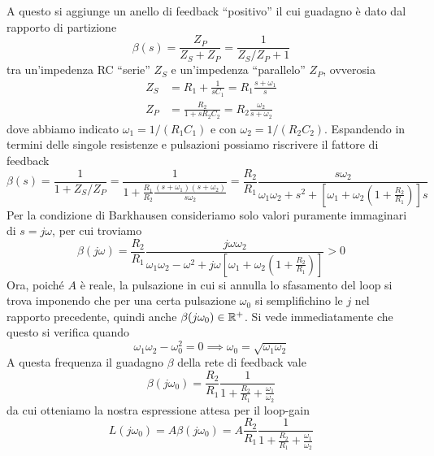 \documentclass[10pt, a4paper, italian]{article}
\begin{document}
A questo si aggiunge un anello di feedback ``positivo'' il cui guadagno è dato
dal rapporto di partizione
\begin{equation} \label{eq:loop-gain-beta}
\beta(s) = \frac{Z_P}{Z_S + Z_P} = \frac{1}{Z_S/Z_P + 1}
\end{equation}
tra un'impedenza RC ``serie'' $Z_S$ e un'impedenza ``parallelo'' $Z_P$,
ovverosia
\begin{align*}
Z_S &= R_1 + \frac{1}{s C_1} = R_1 \frac{s + \omega_1}{s} \\
Z_P &= \frac{R_2}{1 + s R_2 C_2} = R_2 \frac{\omega_2}{s + \omega_2}
\end{align*}
dove abbiamo indicato $\omega_1 = 1/(R_1 C_1)$ e con $\omega_2 = 1/(R_2 C_2)$.
Espandendo in termini delle singole resistenze e pulsazioni possiamo riscrivere
il fattore di feedback
\begin{equation}
\beta(s) = \frac{1}{1 + Z_S/Z_P} =
\frac{1}{1 + \frac{R_1}{R_2} \frac{(s + \omega_1)(s + \omega_2)}{s \omega_2}} =
\frac{R_2}{R_1} \frac{s \omega_2}{\omega_1 \omega_2 + s^2 +
\left[\omega_{1} + \omega_{2} \left(1 + \frac{R_2}{R_{1}}\right)\right] s}
\end{equation}
Per la condizione di Barkhausen consideriamo solo valori puramente immaginari
di $s = j\omega$, per cui troviamo
\begin{equation}
\beta(j\omega) = \frac{R_2}{R_1} \frac{j \omega \omega_2}
{\omega_1 \omega_2 - \omega^2 + j \omega
\left[\omega_1 + \omega_2 \left(1 + \frac{R_2}{R_1}\right)\right]} > 0
\end{equation}
Ora, poiché $A$ è reale, la pulsazione in cui si annulla lo sfasamento del loop
si trova imponendo che per una certa pulsazione $\omega_0$ si
semplifichino le $j$ nel rapporto precedente, quindi anche
$\beta(j \omega_0) \in \mathbb R^+$.
Si vede immediatamente che questo si verifica quando
\begin{equation}\label{eq: omega0}
\omega_1 \omega_2 - \omega_0^2 = 0 \implies \omega_0 =
\sqrt{\omega_1 \omega_2}
\end{equation}
A questa frequenza il guadagno $\beta$ della rete di feedback vale
\[
\beta(j\omega_0) =
\frac{R_2}{R_1} \frac{1}{1 + \frac{R_2}{R_1} + \frac{\omega_1}{\omega_2}}
\]
da cui otteniamo la nostra espressione attesa per il loop-gain
\begin{equation}
L(j \omega_0) = A \beta(j \omega_0) =
A \frac{R_2}{R_1} \frac{1}{1 + \frac{R_2}{R_1} + \frac{\omega_1}{\omega_2}}
\end{equation}
\end{document}
